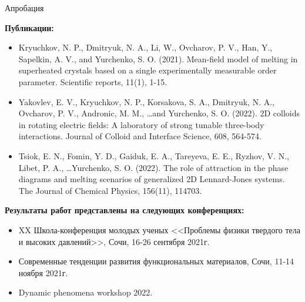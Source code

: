 \documentclass{beamer} %
\begin{document}
\begin{frame}{Апробация}
  \footnotesize{

    \textbf{Публикации:}

    \begin{itemize}
      \item Kryuchkov, N. P., Dmitryuk, N. A., Li, W., Ovcharov, P. V., Han, Y., Sapelkin, A. V., and Yurchenko, S. O. (2021). Mean-field model of melting in superheated crystals based on a single experimentally measurable order parameter. Scientific reports, 11(1), 1-15.
      \item Yakovlev, E. V., Kryuchkov, N. P., Korsakova, S. A., Dmitryuk, N. A., Ovcharov, P. V., Andronic, M. M., \ldots and Yurchenko, S. O. (2022). 2D colloids in rotating electric fields: A laboratory of strong tunable three-body interactions. Journal of Colloid and Interface Science, 608, 564-574.
      \item Tsiok, E. N., Fomin, Y. D., Gaiduk, E. A., Tareyeva, E. E., Ryzhov, V. N., Libet, P. A., \ldots Yurchenko, S. O. (2022). The role of attraction in the phase diagrams and melting scenarios of generalized 2D Lennard-Jones systems. The Journal of Chemical Physics, 156(11), 114703.
    \end{itemize}

    \textbf {Результаты работ представлены на следующих конференциях:}

    \begin{itemize}
      \item XX Школа-конференция молодых ученых <<Проблемы физики твердого тела и высоких давлений>>, Сочи, 16-26 сентября 2021г.
      \item Современные тенденции развития функциональных материалов, Сочи, 11-14 ноября 2021г.
      \item Dynamic phenomena workshop 2022.
    \end{itemize}
  }
\end{frame}
\end{document}
